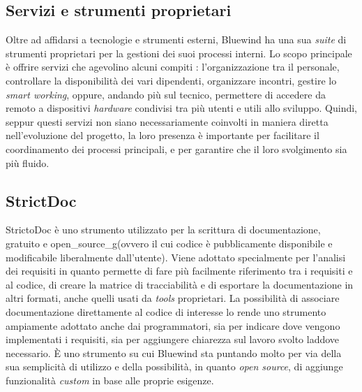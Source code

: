 \subsection{Servizi e strumenti proprietari}
\noindent
Oltre ad affidarsi a tecnologie e strumenti esterni, Bluewind ha una sua \textit{suite} di strumenti proprietari per la gestioni dei suoi processi interni.
Lo scopo principale è offrire servizi che agevolino alcuni compiti : l'organizzazione tra il personale, controllare la disponibilità dei vari dipendenti, organizzare incontri, gestire lo \textit{smart working}, oppure, andando più sul tecnico, permettere di accedere da remoto a dispositivi \textit{hardware} condivisi tra più utenti e utili allo sviluppo.
Quindi, seppur questi servizi non siano necessariamente coinvolti in maniera diretta nell'evoluzione del progetto, la loro presenza è importante per facilitare il coordinamento dei processi principali, e per garantire che il loro svolgimento sia più fluido.


\subsection{StrictDoc}
\noindent
StrictoDoc è uno strumento utilizzato per la scrittura di documentazione, gratuito e \gls{open_source_g}(ovvero il cui codice è pubblicamente disponibile e modificabile liberalmente dall'utente).
Viene adottato specialmente per l'analisi dei requisiti in quanto permette di fare più facilmente riferimento tra i requisiti e al codice, di creare la matrice di tracciabilità e di esportare la documentazione in altri formati, anche quelli usati da \textit{tools} proprietari.
La possibilità di associare documentazione direttamente al codice di interesse lo rende uno strumento ampiamente adottato anche dai programmatori, sia per indicare dove vengono implementati i requisiti, sia per aggiungere chiarezza sul lavoro svolto laddove necessario.
È uno strumento su cui Bluewind sta puntando molto per via della sua semplicità di utilizzo e della possibilità, in quanto \textit{open source}, di aggiunge funzionalità \textit{custom} in base alle proprie esigenze.


